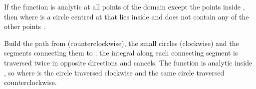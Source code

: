 
\begin{EMtheorem}{}

If the function  is analytic at all points of the domain  except the points  inside , then
where  is a circle centred at  that lies inside  and does not contain any of the other points .

\end{EMtheorem}

\begin{EMjoin}

\begin{EMunit}


\end{EMunit}

\begin{EMproof}{}

Build the path \EMim{\Gamma} from  (counterclockwise), the small circles  (clockwise) and the segments connecting them to ; the integral along each connecting segment is traversed twice in opposite directions and cancels. The function is analytic inside \EMim{\Gamma}, so
where  is the circle  traversed clockwise and  the same circle traversed counterclockwise.

\end{EMproof}

\end{EMjoin}

\begin{EMunit}


\end{EMunit}

